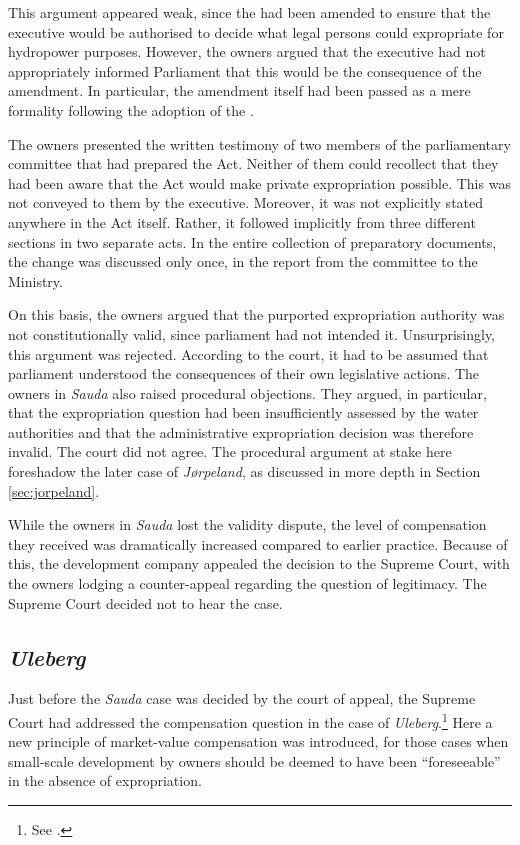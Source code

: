 This argument appeared weak, since the \cite{ea59} had been amended to ensure that the executive would be authorised to decide what legal persons could expropriate for hydropower purposes. However, the owners argued that the executive had not appropriately informed Parliament that this would be the consequence of the amendment. In particular, the amendment itself had been passed as a mere formality following the adoption of the \cite{wra00}. 

The owners presented the written testimony of two members of the parliamentary committee that had prepared the Act. Neither of them could recollect that they had been aware that the Act would make private expropriation possible. This was not conveyed to them by the executive. Moreover, it was not explicitly stated anywhere in the Act itself. Rather, it followed implicitly from three different sections in two separate acts. In the entire collection of preparatory documents, the change was discussed only once, in the report from the committee to the Ministry. 

On this basis, the owners argued that the purported expropriation authority was not constitutionally valid, since parliament had not intended it. Unsurprisingly, this argument was rejected. According to the court, it had to be assumed that parliament understood the consequences of their own legislative actions. The owners in {\it Sauda} also raised procedural objections. They argued, in particular, that the expropriation question had been insufficiently assessed by the water authorities and that the administrative expropriation decision was therefore invalid. The court did not agree. The procedural argument at stake here foreshadow the later case of {\it Jørpeland}, as discussed in more depth in Section \ref{sec:jorpeland}.

While the owners in {\it Sauda} lost the validity dispute, the level of compensation they received was dramatically increased compared to earlier practice. Because of this, the development company appealed the decision to the Supreme Court, with the owners lodging a counter-appeal regarding the question of legitimacy. The Supreme Court decided not to hear the case. 

\subsection{{\it Uleberg}}

Just before the {\it Sauda} case was decided by the court of appeal, the Supreme Court had addressed the compensation question in the case of {\it Uleberg}.\footnote{See \cite{uleberg08}.} Here a new principle of market-value compensation was introduced, for those cases when small-scale development by owners should be deemed to have been ``foreseeable'' in the absence of expropriation.

